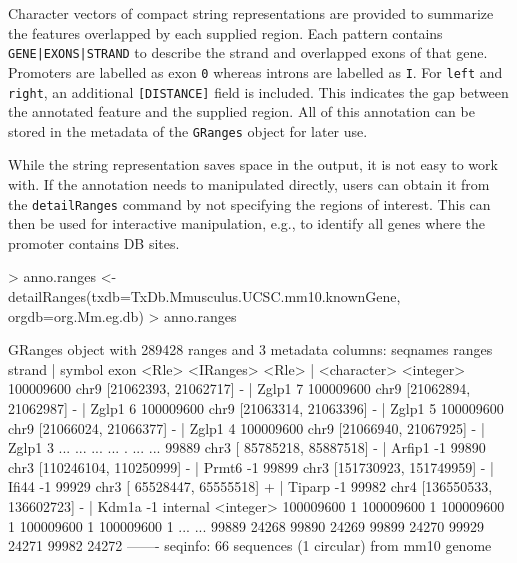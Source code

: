 \documentclass[12pt]{report}
\renewenvironment{Schunk}{\vspace{0pt}}{\vspace{0pt}}
\newcommand{\code}[1]{{\small\texttt{#1}}}
\begin{document}
Character vectors of compact string representations are provided to summarize the features overlapped by each supplied region. 
Each pattern contains \code{GENE|EXONS|STRAND} to describe the strand and overlapped exons of that gene. 
Promoters are labelled as exon \code{0} whereas introns are labelled as \code{I}. 
For \code{left} and \code{right}, an additional \code{[DISTANCE]} field is included.
This indicates the gap between the annotated feature and the supplied region.
All of this annotation can be stored in the metadata of the \code{GRanges} object for later use.

\begin{Schunk}
\end{Schunk}

While the string representation saves space in the output, it is not easy to work with.
If the annotation needs to manipulated directly, users can obtain it from the \code{detailRanges} command by not specifying the regions of interest. 
This can then be used for interactive manipulation, e.g., to identify all genes where the promoter contains DB sites.

\begin{Schunk}
\begin{Sinput}
> anno.ranges <- detailRanges(txdb=TxDb.Mmusculus.UCSC.mm10.knownGene, orgdb=org.Mm.eg.db)
> anno.ranges
\end{Sinput}
\begin{Soutput}
GRanges object with 289428 ranges and 3 metadata columns:
            seqnames                 ranges strand |      symbol      exon
               <Rle>              <IRanges>  <Rle> | <character> <integer>
  100009600     chr9   [21062393, 21062717]      - |       Zglp1         7
  100009600     chr9   [21062894, 21062987]      - |       Zglp1         6
  100009600     chr9   [21063314, 21063396]      - |       Zglp1         5
  100009600     chr9   [21066024, 21066377]      - |       Zglp1         4
  100009600     chr9   [21066940, 21067925]      - |       Zglp1         3
        ...      ...                    ...    ... .         ...       ...
      99889     chr3 [ 85785218,  85887518]      - |      Arfip1        -1
      99890     chr3 [110246104, 110250999]      - |       Prmt6        -1
      99899     chr3 [151730923, 151749959]      - |       Ifi44        -1
      99929     chr3 [ 65528447,  65555518]      + |      Tiparp        -1
      99982     chr4 [136550533, 136602723]      - |       Kdm1a        -1
             internal
            <integer>
  100009600         1
  100009600         1
  100009600         1
  100009600         1
  100009600         1
        ...       ...
      99889     24268
      99890     24269
      99899     24270
      99929     24271
      99982     24272
  -------
  seqinfo: 66 sequences (1 circular) from mm10 genome
\end{Soutput}
\end{Schunk}
\end{document}
